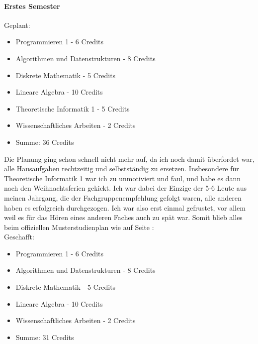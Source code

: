 \paragraph{Erstes Semester}
Geplant:
\begin{itemize}
\item Programmieren 1 - 6 Credits
\item Algorithmen und Datenstrukturen - 8 Credits
\item Diskrete Mathematik - 5 Credits 
\item Lineare Algebra - 10 Credits
\item Theoretische Informatik 1 - 5 Credits
\item Wissenschaftliches Arbeiten - 2 Credits
\item Summe: 36 Credits
\end{itemize}
Die Planung ging schon schnell nicht mehr auf, da ich noch damit
überfordet war, alle Hausaufgaben rechtzeitig und selbstständig zu
ersetzen. Insbesondere für Theoretische Informatik 1 war ich zu
unmotiviert und faul, und habe es dann nach den Weihnachtsferien
gekickt. Ich war dabei der Einzige der 5-6 Leute aus meinen Jahrgang,
die der Fachgruppenempfehlung gefolgt waren, alle anderen haben es
erfolgreich durchgezogen. Ich war also erst einmal gefrustet, vor
allem weil es für das Hören eines anderen Faches auch zu spät
war. Somit blieb alles beim offiziellen Musterstudienplan wie auf
Seite \pageref{musterstudienplan}:\\
Geschafft:
\begin{itemize}
\item Programmieren 1 - 6 Credits
\item Algorithmen und Datenstrukturen - 8 Credits
\item Diskrete Mathematik - 5 Credits 
\item Lineare Algebra - 10 Credits
\item Wissenschaftliches Arbeiten - 2 Credits
\item Summe: 31 Credits
\end{itemize}

